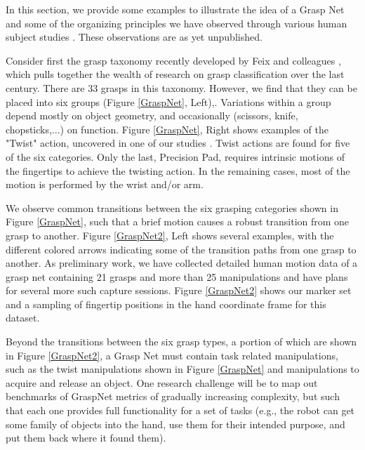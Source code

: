 In this section, we provide some examples to illustrate the idea of a Grasp Net and some of the organizing principles we have observed through various human subject studies \cite{Liu2014, JiaDatabase, Chang:2009:RSSWorkshop, Chang:2014, liu2016annotating}.    These observations are as yet unpublished.

Consider first the grasp taxonomy recently developed by Feix and colleagues \cite{feixgrasp}, which pulls together the wealth of research on grasp classification over the last century.   There are 33 grasps in this taxonomy.  However, we find that they can be placed into six groups (Figure \ref{GraspNet}, Left),.  Variations within a group depend mostly on object geometry, and occasionally (scissors, knife, chopsticks,...) on function.    Figure \ref{GraspNet}, Right shows examples of the "Twist" action, uncovered in one of our studies \cite{liu2016annotating}.    Twist actions are found for five of the six categories.   Only the last, Precision Pad, requires intrinsic motions of the fingertips to achieve the twisting action.   In the remaining cases, most of the motion is performed by the wrist and/or arm.

We observe common transitions between the six grasping categories shown in Figure \ref{GraspNet}, such that a brief motion causes a robust transition from one grasp to another.   Figure \ref{GraspNet2}, Left shows several examples, with the different colored arrows indicating some of the transition paths from one grasp to another.   As preliminary work, we have collected detailed human motion data of a grasp net containing 21 grasps and more than 25 manipulations and have plans for several more such capture sessions.    Figure \ref{GraspNet2} shows our marker set and a sampling of fingertip positions in the hand coordinate frame for this dataset.

Beyond the transitions between the six grasp types, a portion of which are shown in Figure \ref{GraspNet2}, a Grasp Net must contain task related manipulations, such as the twist manipulations shown in Figure \ref{GraspNet} and manipulations to acquire and release an object.   One research challenge will be to map out benchmarks of GraspNet metrics of gradually increasing complexity, but such that each one provides full functionality for a set of tasks (e.g., the robot can get some family of objects into the hand, use them for their intended purpose, and put them back where it found them).
